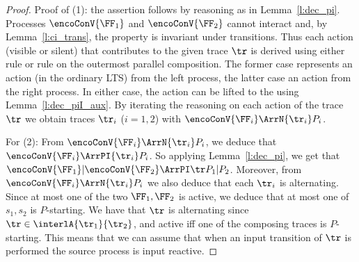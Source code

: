 \begin{proof}
Proof of (1): 
the assertion follows by reasoning as in Lemma~\ref{l:dec_pi}.
Processes 
$\encoConV {\FF_1}$ and  $\encoConV {\FF_2}$ cannot interact and, by
Lemma~\ref{l:ci_trans}, the property is invariant under transitions. 
Thus each action (visible
or silent) that contributes to the given trace $\tr$ is derived using either  
rule {} or  rule {} on the outermost parallel composition. 
The former case represents  an action (in the ordinary LTS) from the left process, the
latter case an action from the right process. In either case, the action can be lifted to 
the  \opLTS using Lemma~\ref{l:dec_piI_aux}. 
By iterating the reasoning on each action of the trace  $\tr$
we obtain traces $\tr_i$ ($i=1,2$) with  
 $\encoConV {\FF_i} \ArrN { \tr_i} P_i$. 


For (2): From $\encoConV {\FF_i} \ArrN { \tr_i} P_i$, we deduce that
$\encoConV {\FF_i} \ArrPI{ \tr_i} P_i$.
So applying Lemma~\ref{l:dec_pi}, we get that 
$\encoConV {\FF_1} |\encoConV {\FF_2} \ArrPI \tr  P_1 | P_2$.
Moreover, from $\encoConV {\FF_i} \ArrN { \tr_i} P_i$ we also deduce
that each $\tr_i$ is alternating. Since at most one of the two
$\FF_1,\FF_2$ is active, we deduce that at most one of $s_1,s_2$ 
is $P$-starting. We have that $\tr$ is alternating since
$\tr \in \interlA{ \tr_1 }{ \tr_2 }$, and 
active iff one of the composing traces is $P$-starting. This means that we can assume 
that when an input transition of $\tr$ is performed the source process is 
input reactive.
\end{proof} 

